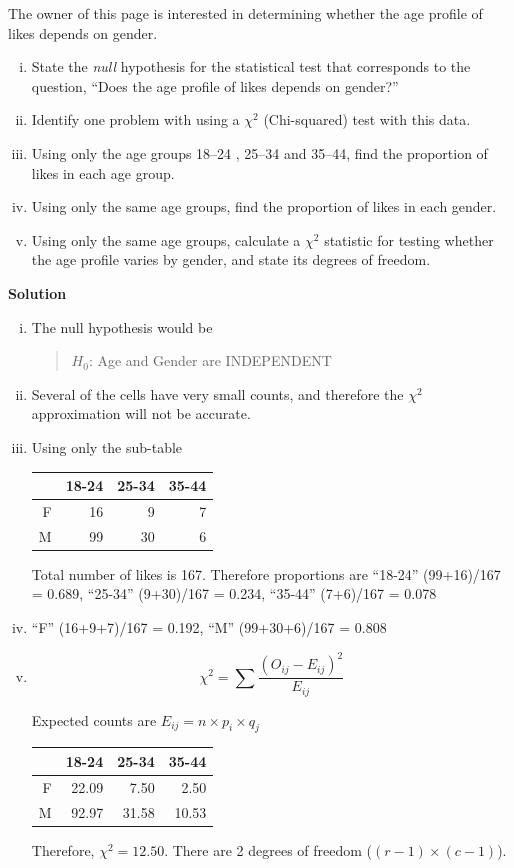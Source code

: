 \documentclass[a4paper,oneside]{book}
\begin{document}
The owner of this page is interested in determining whether the age profile of likes depends on gender.

\begin{enumerate}[i)]
\item State the \emph{null} hypothesis for the statistical test that corresponds to the question, ``Does the age profile of likes depends on gender?''
\item Identify one problem with using a $\chi^2$ (Chi-squared) test with this data.
\item Using only the age groups 18--24 , 25--34  and 35--44, find the proportion of likes in each age group.
\item Using only the same age groups,  find the proportion of likes in each gender.
\item Using only the same age groups,  calculate a $\chi^2$ statistic for testing whether the age
  profile varies by gender, and state its degrees of freedom.
\end{enumerate}

{\bf Solution}

\begin{enumerate}[i)]
\item The null hypothesis would be 

\begin{quote}
$H_0$: Age and Gender are INDEPENDENT
\end{quote}
\item Several of the cells have very small counts, and therefore the
  $\chi^2$ approximation will not be accurate.
\item Using only the sub-table
\begin{center}
\begin{tabular}{rrrr}
  \hline
 & 18-24 & 25-34 & 35-44 \\ 
  \hline
F & 16 & 9 & 7 \\ 
  M & 99 & 30 & 6 \\ 
   \hline
\end{tabular}
\end{center}
Total number of likes is 167. Therefore proportions are ``18-24''
(99+16)/167 = 0.689, ``25-34'' (9+30)/167 = 0.234, ``35-44''
(7+6)/167 = 0.078
\item ``F''  (16+9+7)/167 = 0.192, ``M'' (99+30+6)/167 = 0.808
\item \[
\chi^2 = \sum \frac{(O_{ij}-E_{ij})^2}{E_{ij}}\]

Expected counts are $E_{ij} = n\times p_i \times q_j$
\begin{center}
\begin{tabular}{rrrr}
  \hline
 & 18-24 & 25-34 & 35-44 \\ 
  \hline
F & 22.09 & 7.50 & 2.50 \\ 
  M & 92.97 & 31.58 & 10.53 \\ 
   \hline
\end{tabular}
\end{center}

Therefore, $\chi^2 = 12.50$. There are 2 degrees of freedom
($(r-1)\times (c-1)$).
\end{enumerate}
\end{document}
